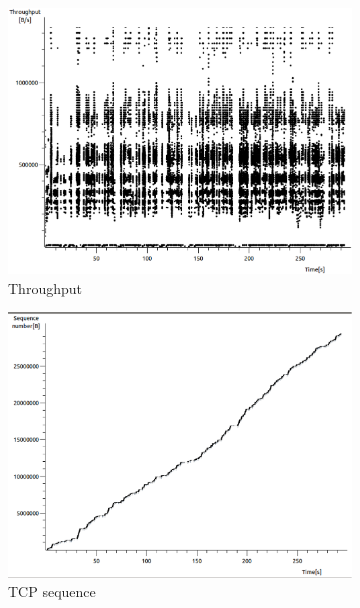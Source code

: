 \documentclass[conference,a4paper]{../../sty/IEEEtran}
\begin{document}
\begin{figure}
 \centering
 \begin{subfigure}[b]{0.2\textwidth}
  \includegraphics[width=\textwidth]{s5-0_th}
  \caption{Throughput}
 \end{subfigure}
 \begin{subfigure}[b]{0.2\textwidth}
  \includegraphics[width=\textwidth]{s5-0_seq}
  \caption{TCP sequence}
 \end{subfigure}
 \begin{subfigure}[b]{0.2\textwidth}

\end{subfigure}
\end{figure}
\end{document}
